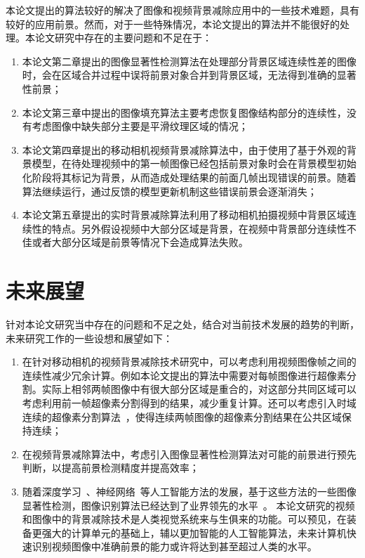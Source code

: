 本论文提出的算法较好的解决了图像和视频背景减除应用中的一些技术难题，具有较好的应用前景。然而，对于一些特殊情况，本论文提出的算法并不能很好的处理。本论文研究中存在的主要问题和不足在于：
\begin{enumerate}
  \item 本论文第二章提出的图像显著性检测算法在处理部分背景区域连续性差的图像时，会在区域合并过程中误将前景对象合并到背景区域，无法得到准确的显著性前景；
  \item 本论文第三章中提出的图像填充算法主要考虑恢复图像结构部分的连续性，没有考虑图像中缺失部分主要是平滑纹理区域的情况；
  \item 本论文第四章提出的移动相机视频背景减除算法中，由于使用了基于外观的背景模型，在待处理视频中的第一帧图像已经包括前景对象时会在背景模型初始化阶段将其标记为背景，从而造成处理结果的前面几帧出现错误的前景。随着算法继续运行，通过反馈的模型更新机制这些错误前景会逐渐消失；

  \item 本论文第五章提出的实时背景减除算法利用了移动相机拍摄视频中背景区域连续性的特点。另外假设视频中大部分区域是背景，在视频中背景部分连续性不佳或者大部分区域是前景等情况下会造成算法失败。

\end{enumerate}
\section{未来展望}
\label{ch6:sec:futureWorks}
针对本论文研究当中存在的问题和不足之处，结合对当前技术发展的趋势的判断，未来研究工作的一些设想和展望如下：
\begin{enumerate}
  \item 在针对移动相机的视频背景减除技术研究中，可以考虑利用视频图像帧之间的连续性减少冗余计算。例如本论文提出的算法中需要对每帧图像进行超像素分割。实际上相邻两帧图像中有很大部分区域是重合的，对这部分共同区域可以考虑利用前一帧超像素分割得到的结果，减少重复计算。还可以考虑引入时域连续的超像素分割算法~\cite{tsp}，使得连续两帧图像的超像素分割结果在公共区域保持连续；
  \item 在视频背景减除算法中，考虑引入图像显著性检测算法对可能的前景进行预先判断，以提高前景检测精度并提高效率；
  \item 随着深度学习~\cite{DeepLearning}、神经网络~\cite{nerualNetworks}等人工智能方法的发展，基于这些方法的一些图像显著性检测，图像识别算法已经达到了业界领先的水平~\cite{NIPS2014_5547,DISC,ImageNet}。 本论文研究的视频和图像中的背景减除技术是人类视觉系统来与生俱来的功能。可以预见，在装备更强大的计算单元的基础上，辅以更加智能的人工智能算法，未来计算机快速识别视频图像中准确前景的能力或许将达到甚至超过人类的水平。
\end{enumerate}

